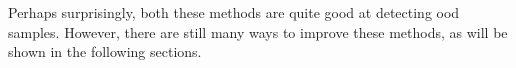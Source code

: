 \documentclass[UKenglish]{uiomasterthesis} %
\theoremstyle{definition}
\begin{document}
Perhaps surprisingly, both these methods are quite good at detecting \ac{ood} samples. However, there are still many ways to improve these methods, as will be shown in the following sections.
\\

%
%
%
%
%
%
%
%
\end{document}
